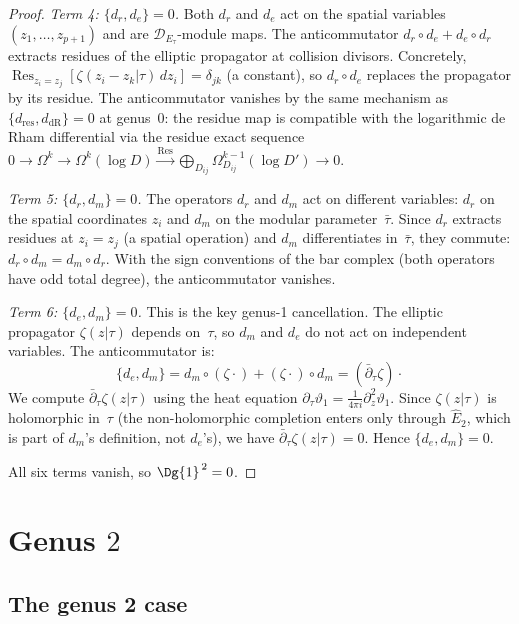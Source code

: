 \begin{proof}
\emph{Term 4: $\{d_r, d_e\} = 0$.}
Both $d_r$ and $d_e$ act on the spatial variables $(z_1, \ldots, z_{p+1})$ and are $\mathcal{D}_{E_\tau}$-module maps. The anticommutator $d_r \circ d_e + d_e \circ d_r$ extracts residues of the elliptic propagator at collision divisors. Concretely, $\operatorname{Res}_{z_i = z_j}[\zeta(z_i - z_k|\tau)\,dz_i] = \delta_{jk}$ (a constant), so $d_r \circ d_e$ replaces the propagator by its residue. The anticommutator vanishes by the same mechanism as $\{d_{\text{res}}, d_{\text{dR}}\} = 0$ at genus~0: the residue map is compatible with the logarithmic de Rham differential via the residue exact sequence $0 \to \Omega^k \to \Omega^k(\log D) \xrightarrow{\operatorname{Res}} \bigoplus_{D_{ij}} \Omega^{k-1}_{D_{ij}}(\log D') \to 0$.

\emph{Term 5: $\{d_r, d_m\} = 0$.}
The operators $d_r$ and $d_m$ act on different variables: $d_r$ on the spatial coordinates $z_i$ and $d_m$ on the modular parameter~$\bar{\tau}$. Since $d_r$ extracts residues at $z_i = z_j$ (a spatial operation) and $d_m$ differentiates in~$\bar{\tau}$, they commute: $d_r \circ d_m = d_m \circ d_r$. With the sign conventions of the bar complex (both operators have odd total degree), the anticommutator vanishes.

\emph{Term 6: $\{d_e, d_m\} = 0$.}
This is the key genus-1 cancellation. The elliptic propagator $\zeta(z|\tau)$ depends on~$\tau$, so $d_m$ and $d_e$ do not act on independent variables. The anticommutator is:
\[\{d_e, d_m\} = d_m \circ (\zeta \cdot) + (\zeta \cdot) \circ d_m = (\bar{\partial}_\tau \zeta) \cdot\]
We compute $\bar{\partial}_\tau \zeta(z|\tau)$ using the heat equation $\partial_\tau \vartheta_1 = \frac{1}{4\pi i}\partial_z^2 \vartheta_1$. Since $\zeta(z|\tau)$ is holomorphic in~$\tau$ (the non-holomorphic completion enters only through $\widehat{E}_2$, which is part of $d_m$'s definition, not $d_e$'s), we have $\bar{\partial}_\tau \zeta(z|\tau) = 0$. Hence $\{d_e, d_m\} = 0$.

All six terms vanish, so $\Dg{1}^{\,2} = 0$.
\end{proof}

\section{\texorpdfstring{Genus $2$}{Genus 2}}
\label{sec:genus-2-complete}

\subsection{The genus 2 case}


